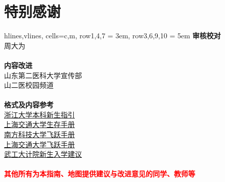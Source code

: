 \chapter*{特别感谢}
\noindent\begin{table*}[h]
    \centering
    \begin{tblr}{
        hlines,vlines,
        cells={c,m},
        row{1,4,7} = {3em},
        row{3,6,9,10} = {5em}
            }
        {\large\textbf{审核校对}}                                                        \\
        {周大为}                                                                        \\
        \\
        {\large\textbf{内容改进}}                                                        \\
        {山东第二医科大学宣传部                                                                 \\
        山二医校园频道}                                                                     \\
        \\
        {\large\textbf{格式及内容参考}}                                                        \\
        
        {\uline{\href{https://zjuers.com/welcome/}{浙江大学本科新生指引}}\\
        \uline{\href{https://survivesjtu.gitbook.io/survivesjtumanual}{上海交通大学生存手册}} \\
        \uline{\href{https://sustech-application.com/}{南方科技大学飞跃手册}}                  \\
        \uline{\href{https://survivesjtu.github.io/SJTU-Application/}{上海交通大学飞跃手册}}  \\
        \uline{\href{https://gitee.com/hanyaner/witjij}{武工大计院新生入学建议}}}\\
        \\
        {\large\textbf{\textcolor{red}{其他所有为本指南、地图提供建议与改进意见的同学、教师等}}}
    \end{tblr}

\end{table*}